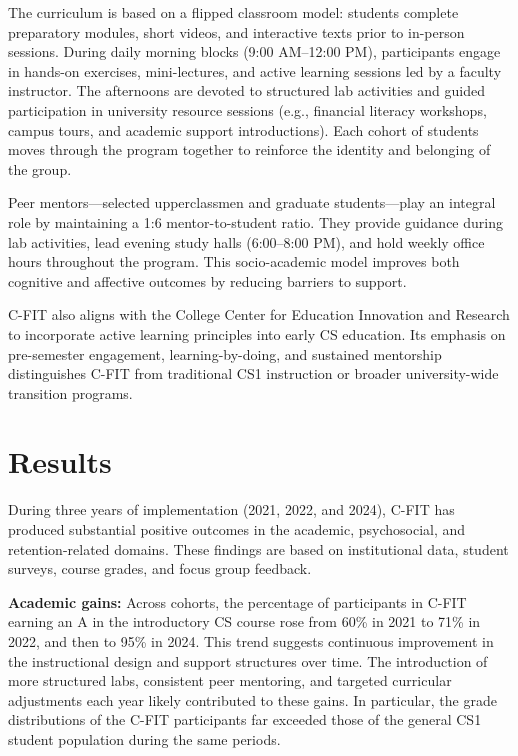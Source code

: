 \documentclass{article}
\begin{document}
The curriculum is based on a flipped classroom model: students complete preparatory modules, short videos, and interactive texts prior to in-person sessions. During daily morning blocks (9:00 AM–12:00 PM), participants engage in hands-on exercises, mini-lectures, and active learning sessions led by a faculty instructor. The afternoons are devoted to structured lab activities and guided participation in university resource sessions (e.g., financial literacy workshops, campus tours, and academic support introductions). Each cohort of students moves through the program together to reinforce the identity and belonging of the group.

Peer mentors—selected upperclassmen and graduate students—play an integral role by maintaining a 1:6 mentor-to-student ratio. They provide guidance during lab activities, lead evening study halls (6:00–8:00 PM), and hold weekly office hours throughout the program. This socio-academic model improves both cognitive and affective outcomes by reducing barriers to support.

C-FIT also aligns with the College Center for Education Innovation and Research to incorporate active learning principles into early CS education. Its emphasis on pre-semester engagement, learning-by-doing, and sustained mentorship distinguishes C-FIT from traditional CS1 instruction or broader university-wide transition programs.

\section{Results}

During three years of implementation (2021, 2022, and 2024), C-FIT has produced substantial positive outcomes in the academic, psychosocial, and retention-related domains. These findings are based on institutional data, student surveys, course grades, and focus group feedback.

\textbf{Academic gains:} Across cohorts, the percentage of participants in C-FIT earning an A in the introductory CS course rose from 60\% in 2021 to 71\% in 2022, and then to 95\% in 2024. This trend suggests continuous improvement in the instructional design and support structures over time. The introduction of more structured labs, consistent peer mentoring, and targeted curricular adjustments each year likely contributed to these gains. In particular, the grade distributions of the C-FIT participants far exceeded those of the general CS1 student population during the same periods.
\end{document}
